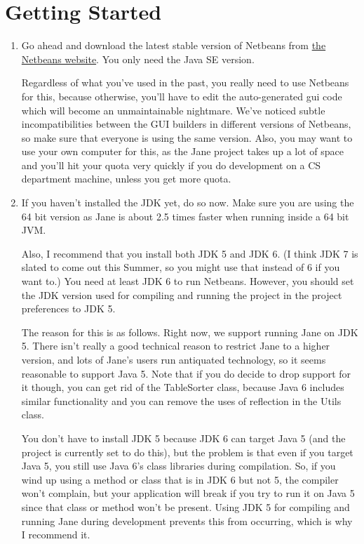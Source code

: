 \documentclass{article}
\begin{document}
\section{Getting Started}
\begin{enumerate}
\item Go ahead and download the latest stable version of Netbeans from \href{http://netbeans.org/}{the Netbeans website}. You only need the Java SE version.

Regardless of what you've used in the past, you really need to use Netbeans for this, because otherwise, you'll have to edit the auto-generated gui code which will become an unmaintainable nightmare. We've noticed subtle incompatibilities between the GUI builders in different versions of Netbeans, so make sure that everyone is using the same version. Also, you may want to use your own computer for this, as the Jane project takes up a lot of space and you'll hit your quota very quickly if you do development on a CS department machine, unless you get more quota.

\item If you haven't installed the JDK yet, do so now. Make sure you are using the 64 bit version as Jane is about 2.5 times faster when running inside a 64 bit JVM.

Also, I recommend that you install both JDK 5 and JDK 6. (I think JDK 7 is slated to come out this Summer, so you might use that instead of 6 if you want to.) You need at least JDK 6 to run Netbeans. However, you should set the JDK version used for compiling and running the project in the project preferences to JDK 5.

The reason for this is as follows. Right now, we support running Jane on JDK 5. There isn't really a good technical reason to restrict Jane to a higher version, and lots of Jane's users run antiquated technology, so it seems reasonable to support Java 5. Note that if you do decide to drop support for it though, you can get rid of the TableSorter class, because Java 6 includes similar functionality and you can remove the uses of reflection in the Utils class.

You don't have to install JDK 5 because JDK 6 can target Java 5 (and the project is currently set to do this), but the problem is that even if you target Java 5, you still use Java 6's class libraries during compilation. So, if you wind up using a method or class that is in JDK 6 but not 5, the compiler won't complain, but your application will break if you try to run it on Java 5 since that class or method won't be present. Using JDK 5 for compiling and running Jane during development prevents this from occurring, which is why I recommend it. 


\end{enumerate}
\end{document}

